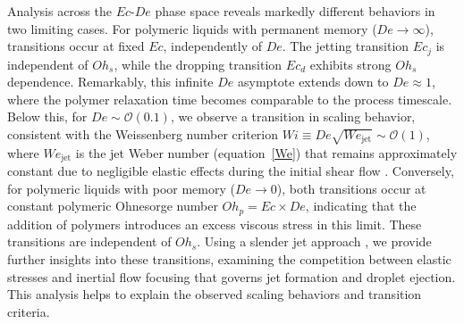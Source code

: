 \documentclass{jfm}
\newcommand{\oo}{\color{black} \normalfont}
\newcommand{\bb}{\color{black} \normalfont}
\begin{document}
Analysis across the $Ec$-$De$ phase space reveals markedly different behaviors in two limiting cases.
For polymeric liquids with permanent memory ($De \to \infty$), transitions occur at fixed $Ec$, independently of $De$. The jetting transition $Ec_j$ is independent of $Oh_s$, while the dropping transition $Ec_d$ exhibits strong $Oh_s$ dependence.
Remarkably, this infinite $De$ asymptote extends down to $De \approx 1$, where the polymer relaxation time becomes comparable to the process timescale.
\oo
Below this, for $De \sim \mathcal{O}(0.1)$, we observe a transition in scaling behavior, consistent with the Weissenberg number criterion $Wi \equiv De\sqrt{We_{\text{jet}}} \sim \mathcal{O}(1)$, where $We_{\text{jet}}$ is the jet Weber number (equation~\eqref{We}) that remains approximately constant due to negligible elastic effects during the initial shear flow \citep{blanco2021jets}.
\bb
Conversely, for polymeric liquids with poor memory ($De \to 0$), both transitions occur at constant polymeric Ohnesorge number $Oh_p = Ec \times De$, indicating that the addition of polymers introduces an excess viscous stress in this limit.
These transitions are independent of $Oh_s$.
Using a slender jet approach \citep{driessen2013stability,gordillo2020impulsive,eggers2015singularities}, we provide further insights into these transitions, examining the competition between elastic stresses and inertial flow focusing that governs jet formation and droplet ejection. This analysis helps to explain the observed scaling behaviors and transition criteria.
\end{document}
